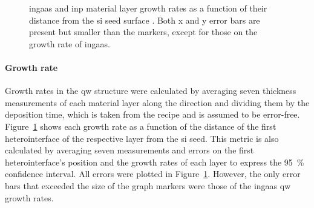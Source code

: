 \begin{figure}
    \centering
    \caption{\acs{ingaas} and \acs{inp} material layer growth rates as a function of their distance from the \acs{si} seed surface \cite{Brugnolotto2023_2}. Both x and y error bars are present but smaller than the markers, except for those on the growth rate of \acs{ingaas}.}
    \label{fig:s6_growth_rates}
\end{figure}

\paragraph{Growth rate} Growth rates in the \acl{qw} structure were calculated by averaging seven thickness measurements of each material layer along the  direction and dividing them by the deposition time, which is taken from the recipe and is assumed to be error-free. Figure~\ref{fig:s6_growth_rates} shows each growth rate as a function of the distance of the first heterointerface of the respective layer from the \acs{si} seed. This metric is also calculated by averaging seven measurements and errors on the first heterointerface's position and the growth rates of each layer to express the \qty{95}{\%} confidence interval. All errors were plotted in Figure~\ref{fig:s6_growth_rates}. However, the only error bars that exceeded the size of the graph markers were those of the \acs{ingaas} \acl{qw} growth rates.

